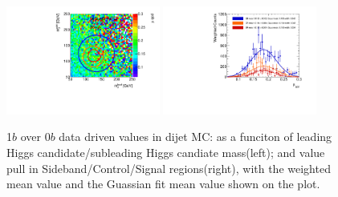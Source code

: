 \begin{figure}[htbp!]
\begin{center}
\includegraphics[width=0.45\textwidth,angle=-90]{figures/boosted/AppendixMuqcdstudy/QCD_OneTag_Incl_mH0H1.pdf}
\includegraphics[width=0.45\textwidth,angle=-90]{figures/boosted/AppendixMuqcdstudy/QCD_OneTag_Incl_mH0H1_pull.pdf}
\caption{1$b$ over 0$b$ data driven \muqcd values in dijet MC: \muqcd as a funciton of leading Higgs candidate/subleading Higgs candiate mass(left); and \muqcd value pull in Sideband/Control/Signal regions(right), with the weighted mean value and the Guassian fit mean value shown on the plot.}
\label{fig:app-muqcd-1b-qcd}
\end{center}
\end{figure}

